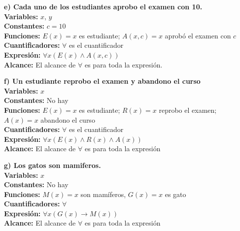 \begin{multicols}{2}
	\textbf{e) Cada uno de los estudiantes aprobo el examen con 10.}\\
	\textbf{Variables: }$x$, $y$\\
	\textbf{Constantes:} $c=10$\\
	\textbf{Funciones: }$E(x)=x$ es estudiante; $A(x,c) = x$ aprobó el examen con $c$\\
	\textbf{Cuantificadores: }$\forall$ es el cuantificador\\
	\textbf{Expresión: }$\forall x(E(x)\land A(x,c))$\\
	\textbf{Alcance: }El alcance de $\forall$ es para toda la expresión.
	\vspace{20px}

	\textbf{f) Un estudiante reprobo el examen y abandono el curso}\\
	\textbf{Variables: } $x$\\
	\textbf{Constantes: }No hay \\
	\textbf{Funciones: } $E(x)=x$ es estudiante; $R(x) =x$ reprobo el examen; $A(x)=x$ abandono el curso\\
	\textbf{Cuantificadores: }$\forall$  es el cuantificador\\
	\textbf{Expresión: }$\forall x(E(x)\land R(x) \land A(x))$ \\
	\textbf{Alcance: } El alcance de $\forall$ es para toda la expresión
	\vspace{20px}

	\textbf{g) Los gatos son mamiferos.}\\
	\textbf{Variables: }$x$\\
	\textbf{Constantes: } No hay\\
	\textbf{Funciones:} $M(x)=x$ son mamíferos, $G(x)= x$ es gato \\
	\textbf{Cuantificadores: }$\forall$\\
	\textbf{Expresión: }$\forall x(G(x)\rightarrow M(x))$\\
	\textbf{Alcance: }El alcance de $\forall$ es para toda la expresión
	\vspace{20px}


\end{multicols}
